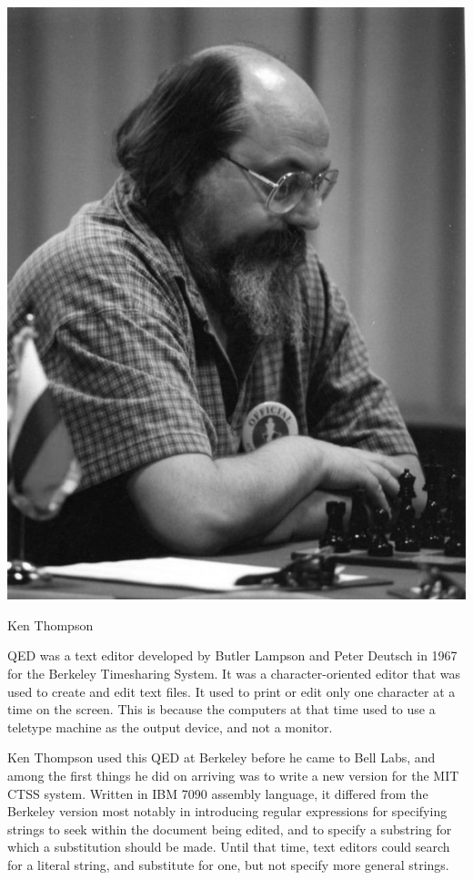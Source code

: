 \begin{marginfigure}
  \includegraphics{images/png/thompson.png}
	\caption{Ken Thompson}
\end{marginfigure}

QED was a text editor developed by Butler Lampson and Peter Deutsch in 1967 for the Berkeley Timesharing System.
It was a character-oriented editor that was used to create and edit text files.
It used to print or edit only one character at a time on the screen.
This is because the computers at that time used to use
a teletype machine as the output device, and not a monitor.

Ken Thompson used this QED at Berkeley before he came to Bell Labs, and among the first things he did on arriving was to write a new version for the MIT CTSS system.
Written in IBM 7090 assembly language, it differed from the Berkeley version most notably in introducing regular expressions
for specifying strings to seek within the document being edited, and to specify a substring for which a substitution should be made.
Until that time, text editors could search for a literal string, and substitute for one, but not specify more general strings.


